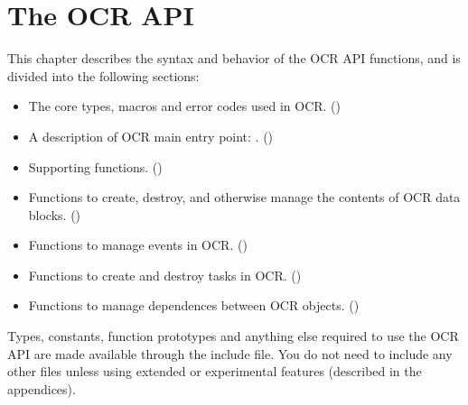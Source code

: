 %

\chapter{The OCR API }
\label{chap:OCRAPI}

This chapter describes the syntax and behavior of the OCR API functions, and is divided
into the following sections:
\begin{itemize}
\item The core types, macros and error codes used in OCR.
()

\item A description of OCR main entry point: .
()

\item Supporting functions.
()

\item Functions to create, destroy, and otherwise manage the contents of OCR data blocks.
()

\item Functions to manage events in OCR.
()

\item Functions to create and destroy tasks in OCR.
()

\item Functions to manage dependences between OCR objects.
()
\end{itemize}

Types, constants, function prototypes and anything else required to use the
OCR API are made available through the  include file. You do not
need to include any other files unless using extended or experimental
features (described in the appendices).

